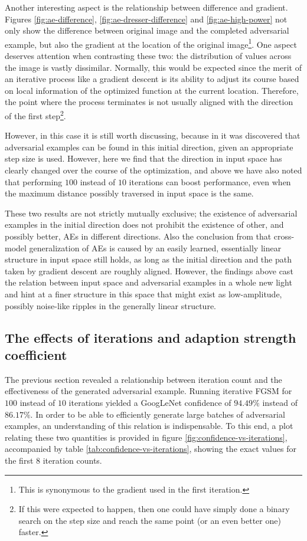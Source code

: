 \documentclass[11pt, a4paper]{article}
\begin{document}
Another interesting aspect is the relationship between difference and gradient. Figures \ref{fig:ae-difference}, \ref{fig:ae-dresser-difference} and \ref{fig:ae-high-power} not only show the difference between original image and the completed adversarial example, but also the gradient at the location of the original image\footnote{This is synonymous to the gradient used in the first iteration.}. One aspect deserves attention when contrasting these two: the distribution of values across the image is vastly dissimilar. Normally, this would be expected since the merit of an iterative process like a gradient descent is its ability to adjust its course based on local information of the optimized function at the current location. Therefore, the point where the process terminates is not usually aligned with the direction of the first step\footnote{If this were expected to happen, then one could have simply done a binary search on the step size and reach the same point (or an even better one) faster.}.

However, in this case it is still worth discussing, because in \cite{explaining-and-harnessing-adversarial-examples} it was discovered that adversarial examples can be found in this initial direction, given an appropriate step size is used. However, here we find that the direction in input space has clearly changed over the course of the optimization, and above we have also noted that performing $100$ instead of $10$ iterations can boost performance, even when the maximum distance possibly traversed in input space is the same.

These two results are not strictly mutually exclusive; the existence of adversarial examples in the initial direction does not prohibit the existence of other, and possibly better, AEs in different directions. Also the conclusion from \cite{explaining-and-harnessing-adversarial-examples} that cross-model generalization of AEs is caused by an easily learned, essentially linear structure in input space still holds, as long as the initial direction and the path taken by gradient descent are roughly aligned. However, the findings above cast the relation between input space and adversarial examples in a whole new light and hint at a finer structure in this space that might exist as low-amplitude, possibly noise-like ripples in the generally linear structure.

\subsection{The effects of iterations and adaption strength coefficient}
The previous section revealed a relationship between iteration count and the effectiveness of the generated adversarial example. Running iterative FGSM for $100$ instead of $10$ iterations yielded a GoogLeNet confidence of $94.49\%$ instead of $86.17\%$. In order to be able to efficiently generate large batches of adversarial examples, an understanding of this relation is indispensable. To this end, a plot relating these two quantities is provided in figure \ref{fig:confidence-vs-iterations}, accompanied by table \ref{tab:confidence-vs-iterations}, showing the exact values for the first 8 iteration counts.
\end{document}
